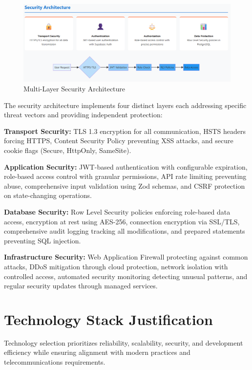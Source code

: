 \begin{figure}[H]
    \centering
    \includegraphics[width=1\linewidth]{img/chap_02/security_architecture.png}
    \caption{Multi-Layer Security Architecture}
    \label{fig:security_architecture}
\end{figure}

The security architecture implements four distinct layers each addressing specific threat vectors and providing independent protection:

\textbf{Transport Security:} TLS 1.3 encryption for all communication, HSTS headers forcing HTTPS, Content Security Policy preventing XSS attacks, and secure cookie flags (Secure, HttpOnly, SameSite).

\textbf{Application Security:} JWT-based authentication with configurable expiration, role-based access control with granular permissions, API rate limiting preventing abuse, comprehensive input validation using Zod schemas, and CSRF protection on state-changing operations.

\textbf{Database Security:} Row Level Security policies enforcing role-based data access, encryption at rest using AES-256, connection encryption via SSL/TLS, comprehensive audit logging tracking all modifications, and prepared statements preventing SQL injection.

\textbf{Infrastructure Security:} Web Application Firewall protecting against common attacks, DDoS mitigation through cloud protection, network isolation with controlled access, automated security monitoring detecting unusual patterns, and regular security updates through managed services.

\section{Technology Stack Justification}

Technology selection prioritizes reliability, scalability, security, and development efficiency while ensuring alignment with modern practices and telecommunications requirements.

